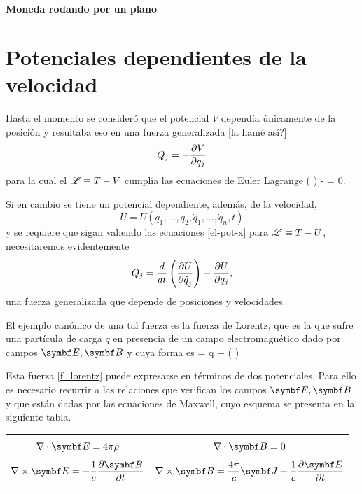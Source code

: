 \documentclass[10pt,oneside]{CBFT_book}
\begin{document}
\begin{ejemplo}{\bf Moneda rodando por un plano}
\label{moneda}
\end{ejemplo}

\section{Potenciales dependientes de la velocidad}

Hasta el momento se consideró que el potencial $V$ dependía únicamente de la posición y resultaba eso en
una fuerza generalizada [la llamé así?]
\[
	Q_j = -\frac{\partial^{\hspace{-0.05em}} {V}}{\partial {q_j}^{\hspace{-0.05em}}}
\]
para la cual el $\mathscr{L}\equiv T-V$ cumplía las ecuaciones de Euler Lagrange
\be
	 \left(  \right) -  = 0.
	\label{el-pot-x}
\ee

Si en cambio se tiene un potencial dependiente, además, de la velocidad,
\[
	U = U(q_1, ..., q_2,\dot{q}_1,...,\dot{q}_n,t ) 
\]
y se requiere que sigan valiendo las ecuaciones \eqref{el-pot-x} para $\mathscr{L} \equiv T-U$, necesitaremos evidentemente
\[
	Q_j = \frac{d^{\hspace{-0.05em}} {}}{d {t}^{\hspace{-0.05em}}} \left( \frac{\partial^{\hspace{-0.05em}} {U}}{\partial {\dot{q}_j}^{\hspace{-0.05em}}} \right)  -\frac{\partial^{\hspace{-0.05em}} {U}}{\partial {q_j}^{\hspace{-0.05em}}},
\]
una fuerza generalizada que depende de posiciones y velocidades.

El ejemplo canónico de una tal fuerza es la fuerza de Lorentz, que es la que sufre una partícula de carga $q$ en
presencia de un campo electromagnético dado por campos $\vb{E}, \vb{B}$ y cuya forma es
\be
	 = q  +  (  \times {} )
	\label{f_lorentz}
\ee

Esta fuerza \eqref{f_lorentz} puede expresarse en términos de dos potenciales. Para ello es necesario recurrir a
las relaciones que verifican los campos $\vb{E}, \vb{B}$ y que están dadas por las ecuaciones de Maxwell, cuyo esquema 
se presenta en la siguiente tabla.
\begin{center}
\begin{tabular}{|c|c|}
\hline
& \\
$ \nabla\cdot\vb{E} = 4 \pi \rho $ & $ \nabla \cdot \vb{B} = 0 $ \\
& \\
$ \displaystyle \rotorm{E} = -\frac{1}{c} \dpar{\vb{B}}{t} $ &  
$ \displaystyle \rotorm{B} = \frac{4\pi}{c}\vb{J} + \frac{1}{c} \dpar{\vb{E}}{t} $ \\
 & \\
\hline
\end{tabular}
\end{center}
\end{document}
